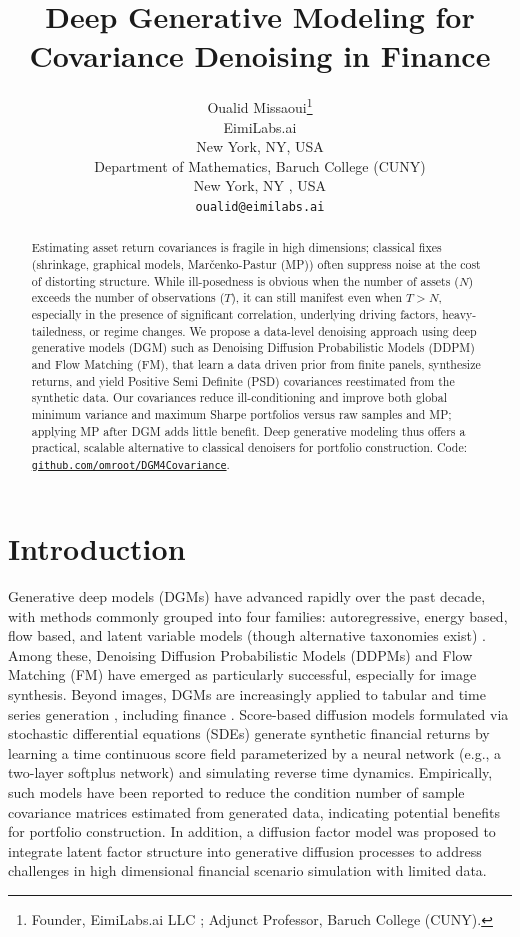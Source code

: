 \documentclass{article}
\title{Deep Generative Modeling for Covariance Denoising in Finance}
\author{
  Oualid Missaoui\thanks{Founder, EimiLabs.ai LLC
  ; Adjunct Professor, Baruch College (CUNY).}\\
  EimiLabs.ai\\
  New York, NY, USA\\
  Department of Mathematics, Baruch College (CUNY)\\
  New York, NY , USA\\
  \texttt{oualid@eimilabs.ai}
}
\begin{document}
\maketitle


\begin{abstract}
Estimating asset return covariances is fragile in high dimensions; classical fixes (shrinkage, graphical models, Mar\v{c}enko-Pastur (MP)) often suppress noise at the cost of distorting structure. While ill-posedness is obvious when the number of assets ($N$) exceeds the number of observations ($T$), it can still manifest even when $T>N$, especially in the presence of significant correlation, underlying driving factors, heavy-tailedness, or regime changes. We propose a data-level denoising approach using deep generative models (DGM) such as Denoising Diffusion Probabilistic Models (DDPM) and Flow Matching (FM), that learn a data driven prior from finite panels, synthesize returns, and yield Positive Semi Definite (PSD) covariances reestimated from the synthetic data.  Our covariances reduce ill-conditioning and improve both global minimum variance and maximum Sharpe portfolios versus raw samples and MP; applying MP after DGM adds little benefit. Deep generative modeling thus offers a practical, scalable alternative to classical denoisers for portfolio construction. Code: \href{https://github.com/omroot/DGM4Covariance}{\texttt{github.com/omroot/DGM4Covariance}}.
\end{abstract}


\section{Introduction}

Generative deep models (DGMs) have advanced rapidly over the past decade, with methods commonly grouped into four families: autoregressive, energy based, flow based, and latent variable models (though alternative taxonomies exist) \cite{dgmjakub2024}. Among these, Denoising Diffusion Probabilistic Models (DDPMs) \cite{ho2020denoising} and Flow Matching (FM) \cite{lipman2023} have emerged as particularly successful, especially for image synthesis. Beyond images, DGMs are increasingly applied to tabular \cite{TabDDPM2023}  and time series generation \cite{diffusionts2024}, including finance \cite{Lesniewski2025}. Score-based diffusion models formulated via stochastic differential equations (SDEs) \cite{YangSong2021} generate synthetic financial returns by learning a time continuous score field parameterized by a neural network (e.g., a two-layer softplus network) and simulating reverse time dynamics. Empirically, such models have been reported to reduce the condition number of sample covariance matrices estimated from generated data, indicating potential benefits for portfolio construction. 
In addition, a diffusion factor model \cite{factordiff2005} was proposed to integrate latent factor structure into generative diffusion processes to address challenges in high dimensional financial scenario simulation with limited data. 
\end{document}
